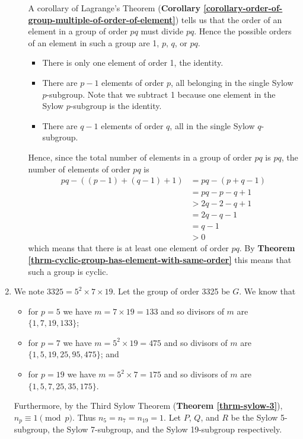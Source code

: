 \begin{enumerate}
\begin{enumerate}[label=(\roman*)]
        A corollary of Lagrange's Theorem (\textbf{Corollary \ref{corollary-order-of-group-multiple-of-order-of-element}}) tells us that the order of an element in a group of order $pq$ must divide $pq$. Hence the possible orders of an element in such a group are 1, $p$, $q$, or $pq$.
        \begin{itemize}
            \item There is only one element of order 1, the identity.
            \item There are $p - 1$ elements of order $p$, all belonging in the single Sylow $p$-subgroup. Note that we subtract 1 because one element in the Sylow $p$-subgroup is the identity.
            \item There are $q - 1$ elements of order $q$, all in the single Sylow $q$-subgroup.
        \end{itemize}
        Hence, since the total number of elements in a group of order $pq$ is $pq$, the number of elements of order $pq$ is
        \begin{align*}
            pq - \left((p-1)+(q-1)+1\right) &= pq - (p+q - 1)\\
            &= pq - p - q + 1\\
            &> 2q - 2 - q + 1\\
            &= 2q - q - 1\\
            &= q - 1\\
            &> 0
        \end{align*}
        which means that there is at least one element of order $pq$. By \textbf{Theorem \ref{thrm-cyclic-group-has-element-with-same-order}} this means that such a group is cyclic.
    \end{enumerate}
    
    \item We note $3325 = 5^2 \times 7 \times 19$. Let the group of order 3325 be $G$. We know that
    \begin{itemize}
        \item for $p = 5$ we have $m = 7 \times 19 = 133$ and so divisors of $m$ are $\{1, 7, 19, 133\}$;
        \item for $p = 7$ we have $m = 5^2 \times 19 = 475$ and so divisors of $m$ are $\{1, 5, 19, 25, 95, 475\}$; and
        \item for $p = 19$ we have $m = 5^2 \times 7 = 175$ and so divisors of $m$ are $\{1, 5, 7, 25, 35, 175\}$.
    \end{itemize}
    Furthermore, by the Third Sylow Theorem (\textbf{Theorem \ref{thrm-sylow-3}}), $n_p \equiv 1 \pmod p$. Thus $n_5 = n_7 = n_{19} = 1$. Let $P$, $Q$, and $R$ be the Sylow 5-subgroup, the Sylow 7-subgroup, and the Sylow 19-subgroup respectively.


\end{enumerate}
